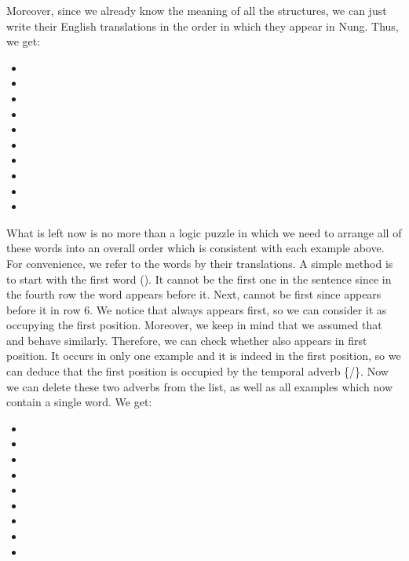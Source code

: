 \begin{refsection}
\begin{mysolution}
Moreover, since we already know the meaning of all the structures, we can just write their English translations in the order in which they appear in Nung. Thus, we get:

\begin{itemize}[noitemsep]
    \item[] 
    \item[] 
    \item[] 
    \item[] 
    \item[] 
    \item[] 
    \item[] 
    \item[] 
    \item[] 
    \item[] 
\end{itemize}

 What is left now is no more than a logic puzzle in which we need to arrange all of these words into an overall order which is consistent with each example above. For convenience, we refer to the words by their translations. A simple method is to start with the first word (). It cannot be the first one in the sentence since in the fourth row the word  appears before it. Next,  cannot be first since  appears before it in row 6. We notice that  always appears first, so we can consider it as occupying the first position. Moreover, we keep in mind that we assumed that  and  behave similarly. Therefore, we can check whether  also appears in first position. It occurs in only one example and it is indeed in the first position, so we can deduce that the first position is occupied by the temporal adverb \{\slash{}\}. Now we can delete these two adverbs from the list, as well as all examples which now contain a single word. We get:\largerpage

\begin{itemize}[noitemsep]
    \item[] 
    \item[] 
    \item[] 
    \item[] 
    \item[] 
    \item[] 
    \item[] 
    \item[] 
    \item[] 
\end{itemize}


\end{mysolution}
\end{refsection}
